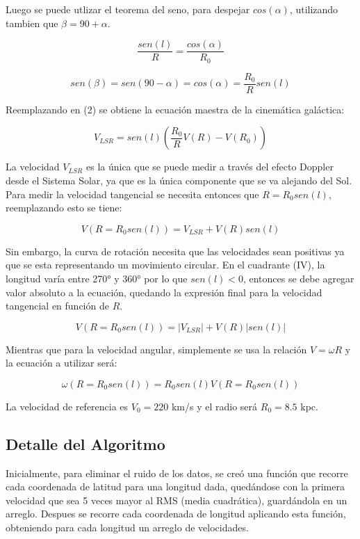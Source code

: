 \documentclass[letterpaper,oneside]{article}
\begin{document}
Luego se puede utlizar el teorema del seno, para despejar $cos(\alpha)$, utilizando tambien que $\beta = 90 + \alpha$.

$$\frac{sen(l)}{R}=\frac{cos(\alpha)}{R_0}$$

$$sen(\beta) = sen(90 - \alpha) = cos(\alpha) = \frac{R_0}{R}sen(l)$$

Reemplazando en (2) se obtiene la ecuación maestra de la cinemática galáctica:

\begin{equation}
    V_{LSR} = sen(l)(\frac{R_0}{R}V(R) - V(R_0))
\end{equation}

La velocidad $V_{LSR}$ es la única que se puede medir a través del efecto Doppler desde el Sistema Solar, ya que es la única componente que se va alejando del Sol. Para medir la velocidad tangencial se necesita entonces que $R = R_0 sen(l)$, reemplazando esto se tiene:

$$ V(R=R_0 sen(l)) = V_{LSR} + V(R)sen(l)  $$

Sin embargo, la curva de rotación necesita que las velocidades sean positivas ya que se esta representando un movimiento circular. En el cuadrante (IV), la longitud varía entre 270° y 360° por lo que $sen(l) < 0$, entonces se debe agregar valor absoluto a la ecuación, quedando la expresión final para la velocidad tangencial en función de $R$.

\begin{equation}
  V ( R=R_0 sen(l)) =   |V_{LSR}| + V(R) |sen(l)| 
\end{equation}

Mientras que para la velocidad angular, simplemente se usa la relación $V=\omega R$ y la ecuación a utilizar será:

\begin{equation}
  \omega ( R=R_0 sen(l)) =  R_0 sen(l)  V ( R=R_0 sen(l))
\end{equation}

La velocidad de referencia es $V_0 = 220$ km/s y el radio será $R_0 = 8.5$ kpc.

\subsection{Detalle del Algoritmo}
Inicialmente, para eliminar el ruido de los datos, se creó una función que recorre cada coordenada de latitud para una longitud dada, quedándose con la primera velocidad que sea 5 veces mayor al RMS (media cuadrática), guardándola en un arreglo. Despues se recorre cada coordenada de longitud aplicando esta función, obteniendo para cada longitud un arreglo de velocidades.\\
\end{document}
